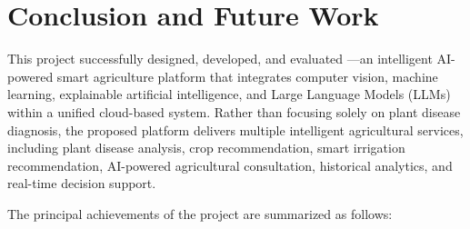 \chapter{Conclusion and Future Work}
\label{chap:conclusion}

This project successfully designed, developed, and evaluated \nabta---an intelligent AI-powered smart agriculture platform that integrates computer vision, machine learning, explainable artificial intelligence, and Large Language Models (LLMs) within a unified cloud-based system. Rather than focusing solely on plant disease diagnosis, the proposed platform delivers multiple intelligent agricultural services, including plant disease analysis, crop recommendation, smart irrigation recommendation, AI-powered agricultural consultation, historical analytics, and real-time decision support.

The principal achievements of the project are summarized as follows:


